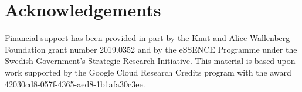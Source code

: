 \documentclass[a4paper, times, 10pt,twocolumn]{article}
\begin{document}







\section*{Acknowledgements}
Financial support has been provided in part by the Knut and Alice Wallenberg Foundation grant number 2019.0352 and by the eSSENCE Programme under the Swedish Government's Strategic Research Initiative.
This material is based upon work supported by the Google Cloud Research Credits program with the award 42030cd8-057f-4365-aed8-1b1afa30c3ee.

\printbibliography
\end{document}
